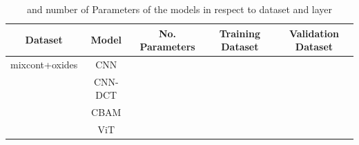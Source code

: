 \begin{table}[H]
    \centering
    \begin{tabular}{c|c|c|c|c}
        Dataset & Model   & No. Parameters & Training Dataset    & Validation Dataset    \\
        \hline
 mixcont+oxides& CNN     &                &                       &                         \\
               & CNN-DCT &                &                       &                         \\
               & CBAM    &                &                       &                         \\
               & ViT     &                &                       &                         \\

    \end{tabular}
    \caption{ and number of Parameters of the models in respect to dataset and layer}
    \label{tab:acc_depth}
\end{table}



